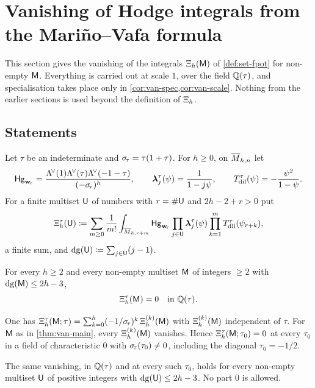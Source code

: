 \section{Vanishing of Hodge integrals from the Mari\~no--Vafa formula}
\label{sec:van}

This section gives the vanishing of the integrals $\Xi_h(\mathsf{M})$ of \cref{def:set-fpot} for non-empty $\mathsf{M}$. Everything is carried out at scale $1$, over the field $\mathbb{Q}(\tau)$, and specialisation takes place only in \cref{cor:van-spec,cor:van-scale}. Nothing from the earlier sections is used beyond the definition of $\Xi_h$.

\subsection{Statements}
\label{sec:van-statements}

Let $\tau$ be an indeterminate and $\sigma_{\!\tau}=\tau(1+\tau)$. For $h\geq 0$, on $\overline{M}_{h,n}$ let
\[
\mathsf{Hg}_{\mathbf{w}_{\!\tau}}=\frac{\Lambda^{\!\vee}(1)\Lambda^{\!\vee}(\tau)\Lambda^{\!\vee}(-1-\tau)}{(-\sigma_{\!\tau})^h},\qquad
\boldsymbol{\lambda}^{\tau}_j(\psi)=\frac{1}{1-j\psi},\qquad
T_{\mathrm{dil}}^{\tau}(\psi)=-\frac{\psi^2}{1-\psi}.
\]
For a finite multiset $\mathsf{U}$ of numbers with $r=\#\mathsf{U}$ and $2h-2+r>0$ put
\begin{equation}\label{eq:van-Xi}
\Xi^{\tau}_h(\mathsf{U})\coloneqq\sum_{m\geq 0}\frac{1}{m!}\int_{\overline{M}_{h,r+m}}\mathsf{Hg}_{\mathbf{w}_{\!\tau}}\prod_{j\in\mathsf{U}}\boldsymbol{\lambda}^{\tau}_j(\psi)\prod_{k=1}^mT_{\mathrm{dil}}^{\tau}(\psi_{r+k}),
\end{equation}
a finite sum, and $\mathrm{dg}(\mathsf{U})\coloneqq\sum_{j\in\mathsf{U}}(j-1)$.

\begin{thm}[{\Lg{Theorem~8.1}}]\label{thm:van-main}
For every $h\geq 2$ and every non-empty multiset $\mathsf{M}$ of integers $\geq 2$ with $\mathrm{dg}(\mathsf{M})\leq 2h-3$,
\[
\Xi^{\tau}_h(\mathsf{M})=0\quad\text{in }\mathbb{Q}(\tau).
\]
\end{thm}

\begin{cor}\label{cor:van-spec}
One has $\Xi^{\tau}_h(\mathsf{M};\tau)=\sum_{k=0}^h(-1/\sigma_{\!\tau})^{k}\,\Xi^{(k)}_h(\mathsf{M})$ with $\Xi^{(k)}_h(\mathsf{M})$ independent of $\tau$. For $\mathsf{M}$ as in \cref{thm:van-main}, every $\Xi^{(k)}_h(\mathsf{M})$ vanishes. Hence $\Xi^{\tau}_h(\mathsf{M};\tau_0)=0$ at every $\tau_0$ in a field of characteristic $0$ with $\sigma_{\!\tau}(\tau_0)\neq 0$, including the diagonal $\tau_0=-1/2$.
\end{cor}
\begin{cor}[{\Lg{Corollary~8.3}}]\label{cor:van-parts}
The same vanishing, in $\mathbb{Q}(\tau)$ and at every such $\tau_0$, holds for every non-empty multiset $\mathsf{U}$ of positive integers with $\mathrm{dg}(\mathsf{U})\leq 2h-3$. No part $0$ is allowed.
\end{cor}

